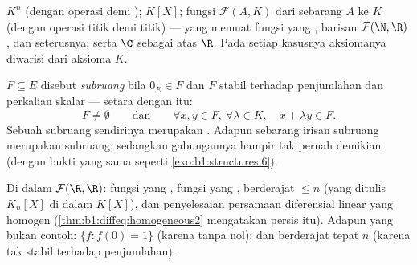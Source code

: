 \begin{example}\label{ex:b1:vspaces:examples}
$K^n$ (dengan operasi  demi );  $K[X]$; fungsi
$\mathcal{F}(A, K)$ dari sebarang  $A$ ke $K$ (dengan operasi
titik demi titik) --- yang memuat fungsi yang , barisan
$\mathcal{F}(\N, \R)$, dan seterusnya; serta $\C$ sebagai  atas $\R$. Pada setiap
kasusnya aksiomanya diwarisi dari aksioma $K$.
\end{example}

\begin{definition}[Subruang]\label{def:b1:vspaces:subspace}
 $F \subseteq E$ disebut \emph{subruang} bila $0_E \in
F$ dan $F$ stabil terhadap penjumlahan dan perkalian skalar ---
setara dengan itu:
\[
F \neq \emptyset
\qquad\text{dan}\qquad
\forall x, y \in F,\ \forall \lambda \in K,\quad
x + \lambda y \in F .
\]
Sebuah subruang sendirinya merupakan . Adapun sebarang irisan subruang
merupakan subruang; sedangkan gabungannya hampir tak pernah demikian (dengan bukti yang sama seperti
\cref{exo:b1:structures:6}).
\end{definition}

\begin{example}\label{ex:b1:vspaces:subspaces}
Di dalam $\mathcal{F}(\R, \R)$: fungsi yang , fungsi yang
,  berderajat $\leq n$ (yang ditulis
$K_n[X]$ di dalam $K[X]$), dan penyelesaian persamaan diferensial linear
yang homogen (\cref{thm:b1:diffeq:homogeneous2} mengatakan persis
itu). Adapun yang bukan contoh: $\{f : f(0) = 1\}$ (karena tanpa nol); dan berderajat tepat
$n$ (karena tak stabil terhadap penjumlahan).
\end{example}


